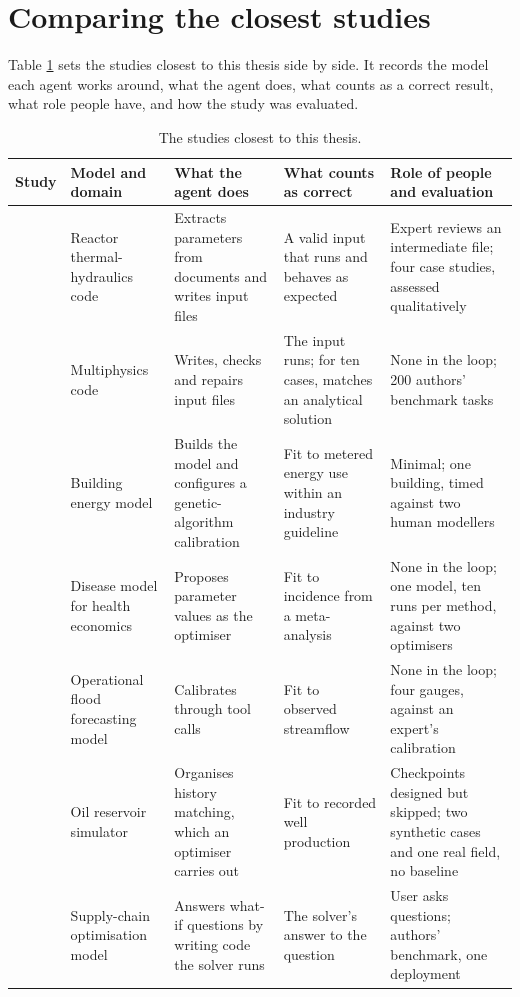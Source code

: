 \section{Comparing the closest studies}

Table \ref{tab:closest-studies} sets the studies closest to this thesis side by side.
It records the model each agent works around, what the agent does, what counts as a correct result, what role people have, and how the study was evaluated.

\begin{table}[htbp]
\centering
\small
\caption{The studies closest to this thesis.}
\label{tab:closest-studies}
\begin{tabularx}{\textwidth}{@{}p{2.3cm}XXXX@{}}
\toprule
Study & Model and domain & What the agent does & What counts as correct & Role of people and evaluation \\
\midrule
\citet{abulawi2026autosam} & Reactor thermal-hydraulics code & Extracts parameters from documents and writes input files & A valid input that runs and behaves as expected & Expert reviews an intermediate file; four case studies, assessed qualitatively \\
\citet{li2026moosenger} & Multiphysics code & Writes, checks and repairs input files & The input runs; for ten cases, matches an analytical solution & None in the loop; 200 authors' benchmark tasks \\
\citet{lu2025automated} & Building energy model & Builds the model and configures a genetic-algorithm calibration & Fit to metered energy use within an industry guideline & Minimal; one building, timed against two human modellers \\
\citet{gomezguillen2026agentic} & Disease model for health economics & Proposes parameter values as the optimiser & Fit to incidence from a meta-analysis & None in the loop; one model, ten runs per method, against two optimisers \\
\citet{li2026hydroagent} & Operational flood forecasting model & Calibrates through tool calls & Fit to observed streamflow & None in the loop; four gauges, against an expert's calibration \\
\citet{samigullin2026multi} & Oil reservoir simulator & Organises history matching, which an optimiser carries out & Fit to recorded well production & Checkpoints designed but skipped; two synthetic cases and one real field, no baseline \\
\citet{li2023large} & Supply-chain optimisation model & Answers what-if questions by writing code the solver runs & The solver's answer to the question & User asks questions; authors' benchmark, one deployment \\

\end{tabularx}
\end{table}
